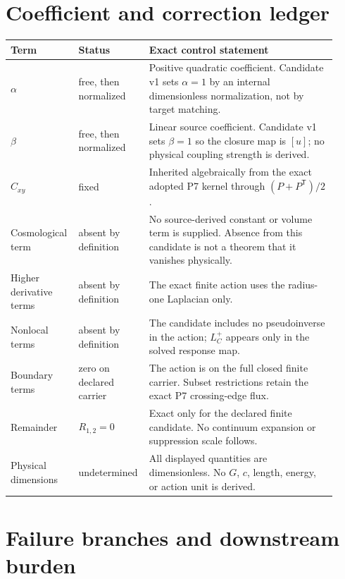 \documentclass[11pt]{article}
\begin{document}
\section{Coefficient and correction ledger}

\begin{longtable}{p{0.18\linewidth}p{0.18\linewidth}p{0.56\linewidth}}
\toprule
Term & Status & Exact control statement\\
\midrule
\(\alpha\) &
free, then normalized &
Positive quadratic coefficient.  Candidate v1 sets \(\alpha=1\) by an
internal dimensionless normalization, not by target matching.\\
\(\beta\) &
free, then normalized &
Linear source coefficient.  Candidate v1 sets \(\beta=1\) so the closure
map is \([u]\); no physical coupling strength is derived.\\
\(C_{xy}\) &
fixed &
Inherited algebraically from the exact adopted P7 kernel through
\((P+P^{\mathsf T})/2\).\\
Cosmological term &
absent by definition &
No source-derived constant or volume term is supplied.  Absence from this
candidate is not a theorem that it vanishes physically.\\
Higher derivative terms &
absent by definition &
The exact finite action uses the radius-one Laplacian only.\\
Nonlocal terms &
absent by definition &
The candidate includes no pseudoinverse in the action; \(L_C^+\) appears
only in the solved response map.\\
Boundary terms &
zero on declared carrier &
The action is on the full closed finite carrier.  Subset restrictions retain
the exact P7 crossing-edge flux.\\
Remainder &
\(R_{1,2}=0\) &
Exact only for the declared finite candidate.  No continuum expansion or
suppression scale follows.\\
Physical dimensions &
undetermined &
All displayed quantities are dimensionless.  No \(G\), \(c\), length,
energy, or action unit is derived.\\
\bottomrule
\end{longtable}

\section{Failure branches and downstream burden}
\end{document}
